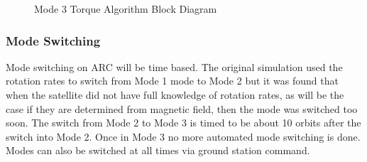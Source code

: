 \begin{figure}[H]
    \centering
    \caption{Mode 3 Torque Algorithm Block Diagram}
    \label{fig:mode3}
\end{figure}

\subsubsection{Mode Switching}

Mode switching on \ac{ARC} will be time based. The original simulation used the rotation rates to switch from Mode 1 mode to Mode 2 but it was found that when the satellite did not have full knowledge of rotation rates, as will be the case if they are determined from magnetic field, then the mode was switched too soon. The switch from Mode 2 to Mode 3 is timed to be about 10 orbits after the switch into Mode 2. Once in Mode 3 no more automated mode switching is done. Modes can also be switched at all times via ground station command.

